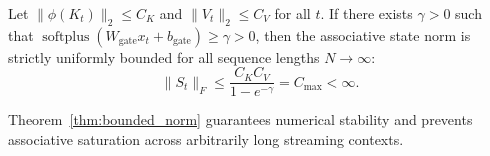 \begin{theorem}
\label{thm:bounded_norm}
Let $\|\phi(K_t)\|_2 \le C_K$ and $\|V_t\|_2 \le C_V$ for all $t$. If there exists $\gamma > 0$ such that $\operatorname{softplus}(W_{\text{gate}} x_t + b_{\text{gate}}) \ge \gamma > 0$, then the associative state norm is strictly uniformly bounded for all sequence lengths $N \to \infty$:
\begin{equation}
\|S_t\|_F \le \frac{C_K C_V}{1 - e^{-\gamma}} = C_{\max} < \infty.
\end{equation}
\end{theorem}
Theorem~\ref{thm:bounded_norm} guarantees numerical stability and prevents associative saturation across arbitrarily long streaming contexts.
